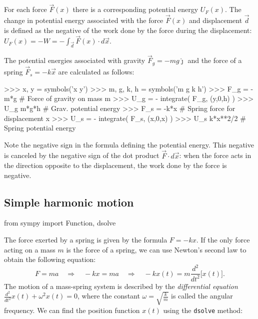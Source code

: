
For each force $\vec{F}(x)$ there is a corresponding potential energy $U_F(x)$.
The change in potential energy associated with the force $\vec{F}(x)$ and displacement $\vec{d}$
is defined as the negative of the work done by the force during the displacement: $U_F(x) = - W = - \int_{\vec{d}} \vec{F}(x)\cdot d\vec{x}$.

The potential energies associated with gravity $\vec{F}_g = -mg\hat{\jmath}$
and the force of a spring $\vec{F}_s = -k\vec{x}$ are calculated as follows:

\small
\begin{verbatimtab}
>>> x, y = symbols('x y')
>>> m, g, k, h = symbols('m g k h')
>>> F_g = -m*g             # Force of gravity on mass m 
>>> U_g = - integrate( F_g, (y,0,h) )
>>> U_g
m*g*h                      # Grav. potential energy 
>>> F_s = -k*x             # Spring force for displacement x 
>>> U_s = - integrate( F_s, (x,0,x) )
>>> U_s
k*x**2/2                   # Spring potential energy 
\end{verbatimtab}
\normalsize

\noindent
Note the negative sign in the formula defining the potential energy.
This negative is canceled by the negative sign of the dot product $\vec{F}\cdot d\vec{x}$:
when the force acts in the direction opposite to the displacement, 
the work done by the force is negative.

\subsection{Simple harmonic motion}
\label{mechanics:simple_harmonic_motion}

\small
\begin{verbatimtab}
from sympy import Function, dsolve
\end{verbatimtab}
\normalsize

\noindent
The force exerted by a spring is given by the formula $F=-kx$.
If the only force acting on a mass $m$ is the force of a spring,
we can use Newton's second law to obtain the following equation:
\[
  F=ma  
  \quad \Rightarrow \quad
  -kx = ma   
  \quad \Rightarrow \quad
  -kx(t) = m\frac{d^2}{dt^2}\Big[x(t)\Big].
\]
The motion of a mass-spring system is described by the \emph{differential equation} $\frac{d^2}{dt^2}x(t) + \omega^2 x(t)=0$,
where the constant $\omega = \sqrt{\frac{k}{m}}$ is called the angular frequency.
We can find the position function $x(t)$ using the \texttt{dsolve} method:

